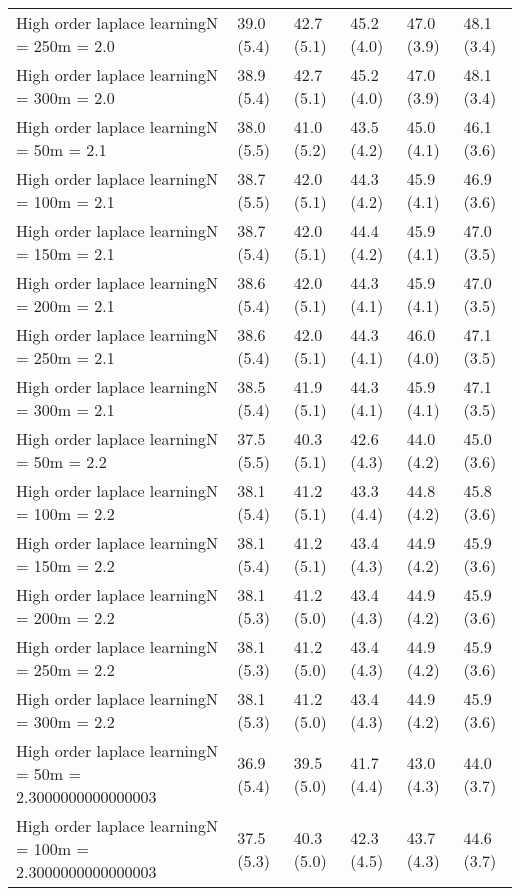 \documentclass{article}
\begin{document}
\begin{table*}[t!]
\begin{center}
\begin{small}
\begin{sc}
\begin{tabular}{llllll}
High order laplace learningN = 250m = 2.0&39.0 (5.4)      &42.7 (5.1)      &45.2 (4.0)      &47.0 (3.9)      &48.1 (3.4)      \\
High order laplace learningN = 300m = 2.0&38.9 (5.4)      &42.7 (5.1)      &45.2 (4.0)      &47.0 (3.9)      &48.1 (3.4)      \\
High order laplace learningN = 50m = 2.1&38.0 (5.5)      &41.0 (5.2)      &43.5 (4.2)      &45.0 (4.1)      &46.1 (3.6)      \\
High order laplace learningN = 100m = 2.1&38.7 (5.5)      &42.0 (5.1)      &44.3 (4.2)      &45.9 (4.1)      &46.9 (3.6)      \\
High order laplace learningN = 150m = 2.1&38.7 (5.4)      &42.0 (5.1)      &44.4 (4.2)      &45.9 (4.1)      &47.0 (3.5)      \\
High order laplace learningN = 200m = 2.1&38.6 (5.4)      &42.0 (5.1)      &44.3 (4.1)      &45.9 (4.1)      &47.0 (3.5)      \\
High order laplace learningN = 250m = 2.1&38.6 (5.4)      &42.0 (5.1)      &44.3 (4.1)      &46.0 (4.0)      &47.1 (3.5)      \\
High order laplace learningN = 300m = 2.1&38.5 (5.4)      &41.9 (5.1)      &44.3 (4.1)      &45.9 (4.1)      &47.1 (3.5)      \\
High order laplace learningN = 50m = 2.2&37.5 (5.5)      &40.3 (5.1)      &42.6 (4.3)      &44.0 (4.2)      &45.0 (3.6)      \\
High order laplace learningN = 100m = 2.2&38.1 (5.4)      &41.2 (5.1)      &43.3 (4.4)      &44.8 (4.2)      &45.8 (3.6)      \\
High order laplace learningN = 150m = 2.2&38.1 (5.4)      &41.2 (5.1)      &43.4 (4.3)      &44.9 (4.2)      &45.9 (3.6)      \\
High order laplace learningN = 200m = 2.2&38.1 (5.3)      &41.2 (5.0)      &43.4 (4.3)      &44.9 (4.2)      &45.9 (3.6)      \\
High order laplace learningN = 250m = 2.2&38.1 (5.3)      &41.2 (5.0)      &43.4 (4.3)      &44.9 (4.2)      &45.9 (3.6)      \\
High order laplace learningN = 300m = 2.2&38.1 (5.3)      &41.2 (5.0)      &43.4 (4.3)      &44.9 (4.2)      &45.9 (3.6)      \\
High order laplace learningN = 50m = 2.3000000000000003&36.9 (5.4)      &39.5 (5.0)      &41.7 (4.4)      &43.0 (4.3)      &44.0 (3.7)      \\
High order laplace learningN = 100m = 2.3000000000000003&37.5 (5.3)      &40.3 (5.0)      &42.3 (4.5)      &43.7 (4.3)      &44.6 (3.7)      \\

\end{tabular}
\end{sc}
\end{small}
\end{center}
\end{table*}
\end{document}
